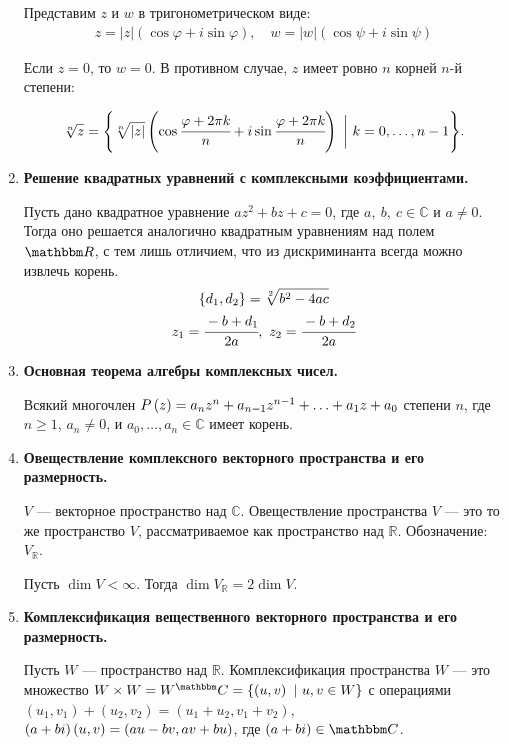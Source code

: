 \begin{enumerate}
Представим $z$ и $w$ в тригонометрическом виде:
\begin{gather*}
z = |z|\left(\cos\varphi+i\sin\varphi\right), \quad w = |w|\left(\cos\psi+i\sin\psi\right)
\end{gather*}

Если $z=0$, то $w=0$. В противном случае, $z$ имеет ровно $n$ корней $n$-й степени:

\[ \sqrt[n]{z} = \Biggl\{\sqrt[n]{|z|}\left(\cos\cfrac{\varphi+2\pi k}{n}+i\sin\cfrac{\varphi+2\pi k }{n}\right)\ \biggl|\ k=0,\ldots,n-1\Biggr\}.
\]

\item \textbf{Решение квадратных уравнений с комплексными коэффициентами.}

Пусть дано квадратное уравнение $az^2+bz+c=0$, где $a,\ b,\ c\in\mathbb{C}$ и 	$ a \neq 0$. Тогда оно решается аналогично квадратным уравнениям над полем $\R$, с тем лишь отличием, что из дискриминанта всегда можно извлечь корень.
\begin{gather*}
\{d_1,d_2\} = \sqrt[2]{b^2-4ac} \\
z_1 = \cfrac{-b+d_1}{2a},\ z_2 = \cfrac{-b+d_2}{2a}
\end{gather*}

\item \textbf{Основная теорема алгебры комплексных чисел.}

Всякий многочлен $P\left(z\right) = a_nz^n + a_{n-1}z^{n-1} + \ldots \hm{+} a_1z + a_0$ степени $n$, где $n \geqslant 1$, $a_n \neq 0$, и $a_0,\ldots,a_n \in \mathbb{C}$ имеет корень.

\item \textbf{Овеществление комплексного векторного пространства и его размерность.}

$V$ --- векторное пространство над $\mathbb{C}$. Овеществление пространства $V$ --- это то же пространство $V$, рассматриваемое как пространство над $\mathbb{R}$. Обозначение: $V_\mathbb{R}$.

Пусть $\dim V < \infty$. Тогда $\dim V_\mathbb{R} = 2\dim V$.

\item \textbf{Комплексификация вещественного векторного пространства и его размерность.}

Пусть $W$ --- пространство над $\mathbb{R}$. Комплексификация пространства $W$ --- это множество $W\times W = W^\mathbb{C} \hm{=} \{\left( u, v\right)\ |\ u,v \in W\}$ с операциями $\left(u_1, v_1\right) + \left(u_2, v_2\right) = \left(u_1+u_2, v_1+v_2\right)$, $\left(a +  bi\right)\left(u, v\right) \hm{=} \left(au-bv, av+bu\right)$, где $(a + bi) \in \C$.


\end{enumerate}
